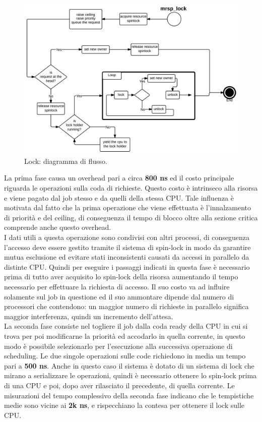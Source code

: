 \begin{figure}
\includegraphics[width=\linewidth]{images/mrsp_lock.jpeg}
\caption{Lock: diagramma di flusso.}
\label{fig:mrsplock}
\end{figure}

\noindent La prima fase causa un overhead pari a circa \textbf{800 ns} ed il costo principale riguarda le operazioni sulla coda di richieste. Questo costo è intrinseco alla risorsa e viene pagato dal job stesso e da quelli della stessa CPU. Tale influenza è motivata dal fatto che la prima operazione che viene effettuata è l'innalzamento di priorità e del ceiling, di conseguenza il tempo di blocco oltre alla sezione critica comprende anche questo overhead.\\

\noindent I dati utili a questa operazione sono condivisi con altri processi, di conseguenza l'accesso deve essere gestito tramite il sistema di spin-lock in modo da garantire mutua esclusione ed evitare stati inconsistenti causati da accessi in parallelo da distinte CPU. Quindi per eseguire i passaggi indicati in questa fase è necessario prima di tutto aver acquisito lo spin-lock della risorsa aumentando il tempo necessario per effettuare la richiesta di accesso. Il suo costo va ad influire solamente sul job in questione ed il suo ammontare dipende dal numero di processori che contendono: un maggior numero di richieste in parallelo significa maggior interferenza, quindi un incremento dell'attesa.\\

\noindent La seconda fase consiste nel togliere il job dalla coda ready della CPU in cui si trova per poi modificarne la priorità ed accodarlo in quella corrente, in questo modo è possibile selezionarlo per l'esecuzione alla successiva operazione di scheduling. Le due singole operazioni sulle code richiedono in media un tempo pari a \textbf{500 ns}. Anche in questo caso il sistema è dotato di un sistema di lock che mirano a serializzare le operazioni, quindi è necessario ottenere lo spin-lock prima di una CPU e poi, dopo aver rilasciato il precedente, di quella corrente. Le misurazioni del tempo complessivo della seconda fase indicano che le tempistiche medie sono vicine ai \textbf{2k ns}, e rispecchiano la contesa per ottenere il lock sulle CPU.\\

